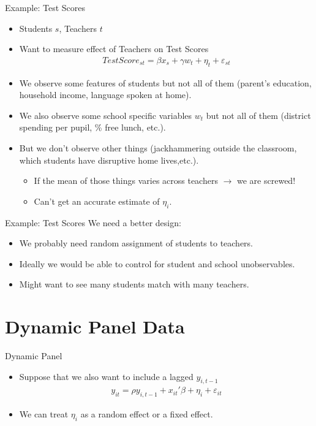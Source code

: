 \documentclass[aspectratio=169]{beamer}
\begin{document}
\begin{frame}{Example: Test Scores}
\begin{itemize}
\item Students $s$, Teachers $t$
\item Want to measure effect of \alert{Teachers} on \alert{Test Scores}
\begin{eqnarray*}
TestScore_{st} = \beta x_s +\gamma w_t+  \eta_{t} + \varepsilon_{st}
\end{eqnarray*}
\item We observe some features of students but not all of them (parent's education, household income, language spoken at home).
\item We also observe some school specific variables $w_t$ but not all of them (district spending per pupil, \% free lunch, etc.).
\item But we don't observe other things (jackhammering outside the classroom, which students have disruptive home lives,etc.).
\begin{itemize}
\item If the mean of those things varies across teachers $\rightarrow$ we are screwed!
\item Can't get an accurate estimate of $\eta_i$.
\end{itemize}
\end{itemize}
\end{frame}


\begin{frame}{Example: Test Scores}
We need a better design:
\begin{itemize}
\item We probably need random assignment of students to teachers.
\item Ideally we would be able to control for student and school unobservables.
\item Might want to see many students match with many teachers.
\end{itemize}
\end{frame}

\section*{Dynamic Panel Data}

\begin{frame}{Dynamic Panel}
\begin{itemize}
\item Suppose that we also want to include a lagged $y_{i,t-1}$
\begin{eqnarray*}
y_{it} = \rho y_{i,t-1} + x_{it}'\beta + \eta_i + \varepsilon_{it}
\end{eqnarray*}
\item We can treat $\eta_i$ as a \alert{random effect} or a \alert{fixed effect}.
\end{itemize}
\end{frame}
\end{document}

